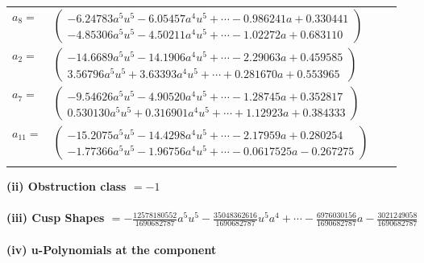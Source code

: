 \documentclass[1p]{elsarticle_modified}
\theoremstyle{definition}
\begin{document}
\begin{tabular}{m{7pt} m{180pt} m{7pt} m{180pt} }
\flushright $a_{8}=$&$\begin{pmatrix}-6.24783 a^{5} u^{5}-6.05457 a^{4} u^{5}+\cdots-0.986241 a+0.330441\\-4.85306 a^{5} u^{5}-4.50211 a^{4} u^{5}+\cdots-1.02272 a+0.683110\end{pmatrix}$ \\
\flushright $a_{2}=$&$\begin{pmatrix}-14.6689 a^{5} u^{5}-14.1906 a^{4} u^{5}+\cdots-2.29063 a+0.459585\\3.56796 a^{5} u^{5}+3.63393 a^{4} u^{5}+\cdots+0.281670 a+0.553965\end{pmatrix}$ \\
\flushright $a_{7}=$&$\begin{pmatrix}-9.54626 a^{5} u^{5}-4.90520 a^{4} u^{5}+\cdots-1.28745 a+0.352817\\0.530130 a^{5} u^{5}+0.316901 a^{4} u^{5}+\cdots+1.12923 a+0.384333\end{pmatrix}$ \\
\flushright $a_{11}=$&$\begin{pmatrix}-15.2075 a^{5} u^{5}-14.4298 a^{4} u^{5}+\cdots-2.17959 a+0.280254\\-1.77366 a^{5} u^{5}-1.96756 a^{4} u^{5}+\cdots-0.0617525 a-0.267275\end{pmatrix}$\\&\end{tabular}
\flushleft \textbf{(ii) Obstruction class $= -1$}\\~\\
\flushleft \textbf{(iii) Cusp Shapes $= -\frac{12578180552}{1690682787} a^5 u^5-\frac{35048362616}{1690682787} u^5 a^4+\cdots-\frac{6976030156}{1690682787} a-\frac{3021249058}{1690682787}$}\\~\\
\newpage\renewcommand{\arraystretch}{1}
\flushleft \textbf{(iv) u-Polynomials at the component}\newline \\
\end{document}
